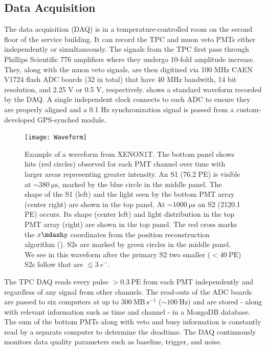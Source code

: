 \subsection{Data Acquisition}
\label{subsec:xenon1t_daq}
The data acquisition (DAQ) is in a temperature-controlled room on the second floor of the service building.  It can record the TPC and
muon veto PMTs either independently or simultaneously.  The signals from the TPC first pass through Phillips Scientific 776 amplifiers
where they undergo 10-fold amplitude increase.  They, along with the muon veto signals, are then digitized via 100 MHz CAEN V1724 flash
ADC boards (32 in total) that have 40 MHz bandwith, 14 bit resolution, and 2.25 V or 0.5 V, respectively.  
shows a standard waveform recorded by the DAQ.  A single independent clock
connects to each ADC to ensure they are properly aligned and a 0.1 Hz synchronization signal is passed from a custom-developed GPS-synched
module.

\begin{figure}
\centering
\texttt{[image: Waveform]}
\caption{Example of a waveform from XENON1T.  The bottom panel shows hits (red circles) observed for each PMT channel over time with
larger areas representing greater intensity.  An S1 (76.2 PE) is visible at ${\sim}380\ \mathrm{\mu s}$, marked by the blue circle in the
middle panel.  The shape of the S1 (left) and the light seen by the bottom PMT array (center right) are shown in the top panel.  At
${\sim} 1000\ \mathrm{\mu s}$ an S2 (2120.1 PE) occurs.  Its shape (center left) and light distribution in the top PMT array (right) are
shown in the top panel.  The red cross marks the $x \mdash y$ coordinates from the position reconstruction algorithm
().  S2s are marked by
green circles in the middle panel.  We see in this waveform after the primary S2 two smaller ($< 40\ \mathrm{PE}$) S2s follow that are
$\lesssim 3\ e^-$.}
\label{fig:xenon1t_waveform}
\end{figure}

The TPC DAQ reads every pulse $> 0.3\ \mathrm{PE}$ from each PMT independently and regardless of any signal from other
channels.  The read-outs of the ADC boards are passed to six computers at up to $300\ \mathrm{MB\ s^{-1}}$ (${\sim}100\ \mathrm{Hz}$) and
are stored - along with relevant information such as time and channel - in a MongoDB database.  The sum of the bottom PMTs along with veto
and busy information is constantly read by a separate computer to determine the deadtime.  The DAQ continuously monitors data quality
parameters such as baseline, trigger, and noise.

